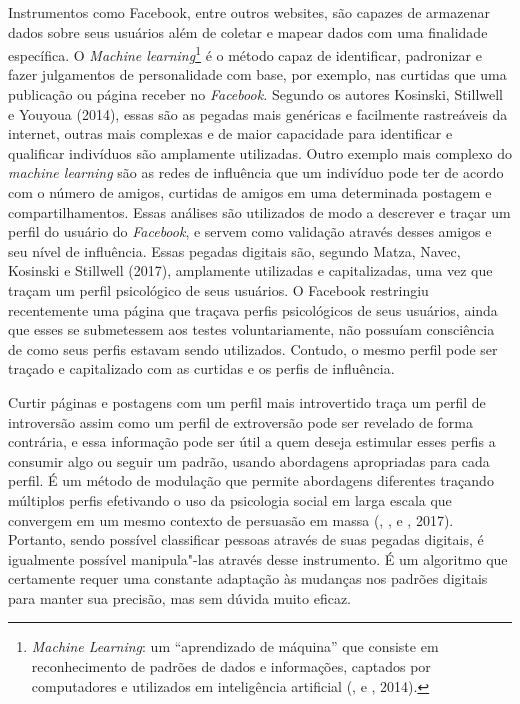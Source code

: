 Instrumentos como Facebook, entre outros websites, são capazes de
armazenar dados sobre seus usuários além de coletar e mapear dados com
uma finalidade específica. O \emph{Machine learning}\footnote{\emph{Machine
  Learning}: um ``aprendizado de máquina'' que consiste em reconhecimento
  de padrões de dados e informações, captados por computadores e
  utilizados em inteligência artificial (,  e ,
  2014).} é o método capaz de identificar, padronizar e fazer julgamentos
de personalidade com base, por exemplo, nas curtidas que uma publicação
ou página receber no \emph{Facebook.} Segundo os autores
Kosinski, Stillwell e Youyoua (2014), essas são as pegadas mais genéricas
e facilmente rastreáveis da internet, outras mais complexas e de maior
capacidade para identificar e qualificar indivíduos são amplamente
utilizadas. Outro exemplo mais complexo do \emph{machine learning} são
as redes de influência que um indivíduo pode ter de acordo com o número
de amigos, curtidas de amigos em uma determinada postagem e
compartilhamentos. Essas análises são utilizados de modo a descrever
e traçar um perfil do usuário do \emph{Facebook}, e servem como
validação através desses amigos e seu nível de influência. Essas pegadas
digitais são, segundo Matza, Navec, Kosinski e Stillwell (2017),
amplamente utilizadas e capitalizadas, uma vez que traçam um perfil
psicológico de seus usuários. O Facebook restringiu recentemente uma
página que traçava perfis psicológicos de seus usuários, ainda que esses
se submetessem aos testes voluntariamente, não possuíam consciência de
como seus perfis estavam sendo utilizados. Contudo, o mesmo perfil pode
ser traçado e capitalizado com as curtidas e os perfis de influência.

Curtir páginas e postagens com um perfil mais introvertido traça um
perfil de introversão assim como um perfil de extroversão pode ser
revelado de forma contrária, e essa informação pode ser útil a quem
deseja estimular esses perfis a consumir algo ou seguir um padrão,
usando abordagens apropriadas para cada perfil. É um método de modulação
que permite abordagens diferentes traçando múltiplos perfis efetivando o
uso da psicologia social em larga escala que convergem em um mesmo
contexto de persuasão em massa (, ,  e , 2017).
Portanto, sendo possível classificar pessoas através de suas pegadas
digitais, é igualmente possível manipula"-las através desse instrumento.
É um algoritmo que certamente requer uma constante adaptação às mudanças
nos padrões digitais para manter sua precisão, mas sem dúvida muito
eficaz.

